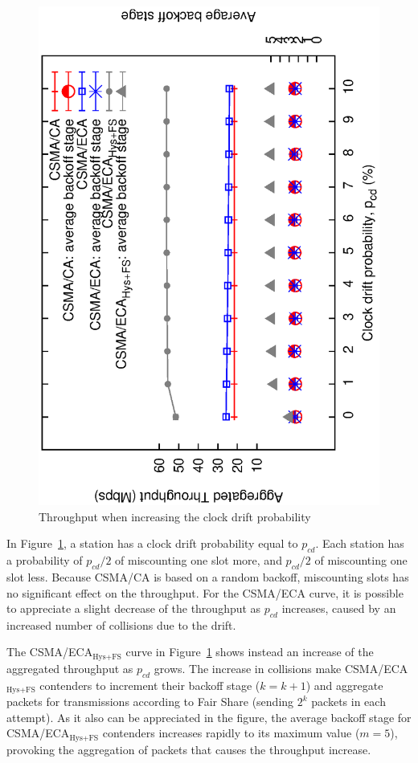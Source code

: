 \documentclass[a4paper,journal]{IEEEtran}
\begin{document}
	\begin{figure}[tb]
	\centering
		\includegraphics[width=0.7\linewidth,angle=-90]{figures/clockDrift/throughput_and_BOS_w_SD.eps}
		\caption{Throughput when increasing the clock drift probability}
		\label{fig:clockDrift}
	\end{figure}
	
	In Figure~\ref{fig:clockDrift}, a station has a clock drift probability equal to $p_{cd}$. Each station has a probability of $p_{cd}/2$ of miscounting one slot more, and $p_{cd}/2$ of miscounting one slot less. Because CSMA/CA is based on a random backoff, miscounting slots has no significant effect on the throughput. For the CSMA/ECA curve, it is possible to appreciate a slight decrease of the throughput as $p_{cd}$ increases, caused by an increased number of collisions due to the drift.
	
	The CSMA/ECA$_{\text{Hys+FS}}$ curve in Figure~\ref{fig:clockDrift} shows instead an increase of the aggregated throughput as $p_{cd}$ grows. The increase in collisions make CSMA/ECA$_{\text{Hys+FS}}$ contenders to increment their backoff stage ($k=k+1$) and aggregate packets for transmissions according to Fair Share (sending $2^{k}$ packets in each attempt). As it also can be appreciated in the figure, the average backoff stage for CSMA/ECA$_{\text{Hys+FS}}$ contenders increases rapidly to its maximum value ($m=5$), provoking the aggregation of packets that causes the throughput increase.
	\\
\end{document}
